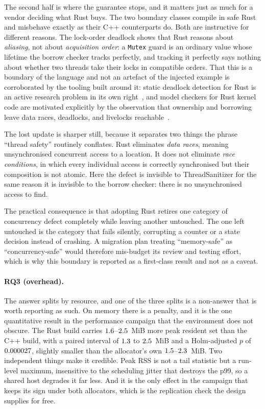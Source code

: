 \documentclass[english,twoside,openright,a4paper,censored,csm,software-track-2020]{HYthesisML}
\begin{document}
The second half is where the guarantee stops, and it matters just as much for a vendor
deciding what Rust buys. The two boundary classes compile in safe Rust and misbehave exactly
as their C++ counterparts do. Both are instructive for different reasons. The lock-order
deadlock shows that Rust reasons about \emph{aliasing}, not about \emph{acquisition order}: a
\texttt{Mutex} guard is an ordinary value whose lifetime the borrow checker tracks perfectly,
and tracking it perfectly says nothing about whether two threads take their locks in
compatible orders. That this is a boundary of the language and not an artefact of the
injected example is corroborated by the tooling built around it: static deadlock detection for
Rust is an active research problem in its own right~\cite{zhang2026deadlock}, and model
checkers for Rust kernel code are motivated explicitly by the observation that ownership and
borrowing leave data races, deadlocks, and livelocks
reachable~\cite{tang2025converos}.

The lost update is sharper still, because it separates two things the phrase ``thread safety''
routinely conflates. Rust eliminates \emph{data races}, meaning unsynchronised concurrent access
to a location. It does not eliminate \emph{race conditions}, in which every individual access is
correctly synchronised but their composition is not atomic. Here the defect is invisible to
ThreadSanitizer for the same reason it is invisible to the borrow checker: there is no
unsynchronised access to find.

The practical consequence is that adopting Rust retires one category of concurrency defect
completely while leaving another untouched. The one left untouched is the category that fails
silently, corrupting a counter or a state decision instead of crashing. A migration plan treating
``memory-safe'' as ``concurrency-safe'' would therefore mis-budget its review and testing effort,
which is why this boundary is reported as a first-class result and not as a caveat.

\paragraph{RQ3 (overhead).} The answer splits by resource, and one of the three splits is a
non-answer that is worth reporting as such. On memory there is a penalty, and it is the one
quantitative result in the performance campaign that the environment does not obscure. The Rust
build carries $1.6$--$2.5$~MiB more peak resident set than the C++ build,
with a paired interval of $1.3$ to $2.5$~MiB and a Holm-adjusted $p$ of
$0.000027$, slightly smaller than the allocator's own
$1.5$--$2.3$~MiB. Two independent things make it credible. Peak RSS is
not a tail statistic but a run-level maximum, insensitive to the scheduling jitter that
destroys the p99, so a shared host degrades it far less. And it is the only effect in the
campaign that keeps its sign under both allocators, which is the replication check the design
supplies for free.
\end{document}
